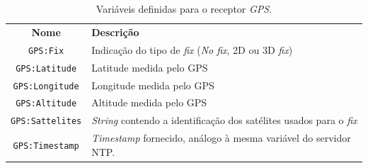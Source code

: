 \begin{table}[h]
	\centering
	\caption{\label{tab:gpsd} Variáveis definidas para o receptor
	\textit{GPS}.}
	\begin{tabular}{| c | l |}
		\hline
		\textbf{Nome} & \textbf{Descrição} \\	\hhline{|=|=|}
		\texttt{GPS:Fix} & Indicação do tipo de \textit{fix} (\textit{No fix},
		2D ou 3D \textit{fix})	\\ \hline  
		\texttt{GPS:Latitude} & Latitude medida pelo GPS \\ \hline
		\texttt{GPS:Longitude} & Longitude medida pelo GPS \\ \hline
		\texttt{GPS:Altitude} & Altitude medida pelo GPS \\ \hline
		\texttt{GPS:Sattelites} & \textit{String} contendo a identificação dos
		satélites usados para o \textit{fix} \\ \hline 
		\texttt{GPS:Timestamp} & \textit{Timestamp} fornecido, análogo à mesma
		variável do servidor NTP. \\ \hline
	\end{tabular}	   

\end{table}

